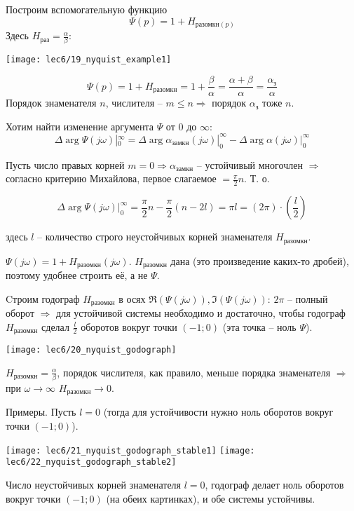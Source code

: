 \documentclass[main.tex]{subfiles}
\begin{document}
Построим вспомогательную функцию
$$ \Psi(p) = 1 + H_{\text{разомкн}(p)} $$
Здесь $ H_{\text{раз}}=\frac{\alpha}{\beta} $:

\texttt{[image: lec6/19\_nyquist\_example1]}

$$ \Psi(p) = 1 + H_{\text{разомкн}} = 1 + \frac{\beta}{\alpha} = \frac{\alpha + \beta}{\alpha} = \frac{\alpha_{\text{з}}}{\alpha} $$
Порядок знаменателя $n$, числителя -- $ m \le n \Rightarrow $ порядок $ \alpha_{\text{з}} $ тоже $ n $.

Хотим найти изменение аргумента $ \Psi $ от $ 0 $ до $ \infty $:
$$ \Delta \arg \Psi(j\omega) |_0^\infty = \Delta  \arg \alpha_{\text{замкн}}(j\omega)|_0^\infty - \Delta  \arg \alpha(j\omega)|_0^\infty $$

Пусть число правых корней $ m=0 \Rightarrow \alpha_{\text{замкн}} $ -- устойчивый многочлен $ \Rightarrow $ согласно критерию Михайлова, первое слагаемое $ = \frac{\pi}{2} n $. Т. о.

$$ \Delta \arg \Psi(j\omega) |_0^\infty = \frac{\pi}{2} n - \frac{\pi}{2} (n - 2l) = \pi l = (2 \pi) \cdot \left( \frac{l}{2}\right)  $$

здесь $ l $ -- количество строго неустойчивых корней знаменателя $ H_{\text{разомкн}} $.

$ \Psi(j \omega) = 1 + H_{\text{разомкн}} (j \omega) $.
$ H_{\text{разомкн}} $ дана (это произведение каких-то дробей), поэтому удобнее строить её, а не $ \Psi $.

Cтроим годограф $ H_{\text{разомкн}} $ в осях $ \Re( \Psi(j \omega) ), \Im( \Psi(j \omega)) $:
$ 2 \pi $ -- полный оборот $ \Rightarrow $ для устойчивой системы необходимо и достаточно, чтобы годограф $ H_{\text{разомкн}} $ сделал $ \frac{l}{2} $ оборотов вокруг точки $ (-1;0) $ (эта точка -- ноль $ \Psi $).

\texttt{[image: lec6/20\_nyquist\_godograph]}

$ H_{\text{разомкн}} = \frac{\alpha}{\beta} $, порядок числителя, как правило, меньше порядка знаменателя $ \Rightarrow $ при $ \omega \to \infty $ $ H_{\text{разомкн}} \to 0 $.


Примеры.
Пусть $ l = 0 $ (тогда для устойчивости нужно ноль оборотов вокруг точки $ (-1;0) $).

\texttt{[image: lec6/21\_nyquist\_godograph\_stable1]}
\texttt{[image: lec6/22\_nyquist\_godograph\_stable2]}

Число неустойчивых корней знаменателя $ l = 0 $, годограф делает ноль оборотов вокруг точки $ (-1;0) $ (на обеих картинках), и обе системы устойчивы.
\end{document}
